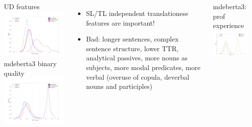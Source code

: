 \documentclass[11pt]{beamer} %
\begin{document}
\begin{frame}{}
	\begin{columns}
		UD features
		\includegraphics[width=5cm]{pca/src-qua-ttype-ud-PCA-D1-lines}
		mdeberta3 binary quality
		\includegraphics[width=5cm]{pca/src-qua-ttype-mdeberta3-base-PCA-D1-lines}
		\begin{itemize}
			\item SL/TL independent translationese features are important!
			\item Bad: \footnotesize{longer sentences, complex sentence structure, lower TTR, analytical passives, more nouns as subjects, more modal predicates, more verbal (overuse of copula, deverbal nouns and participles)}
		\end{itemize}
		mdeberta3: prof experience \includegraphics[width=5cm]{pca/src-var-ttype-mdeberta3-base-PCA-D1-lines.png}
	\end{columns}
\end{frame}
\end{document}
